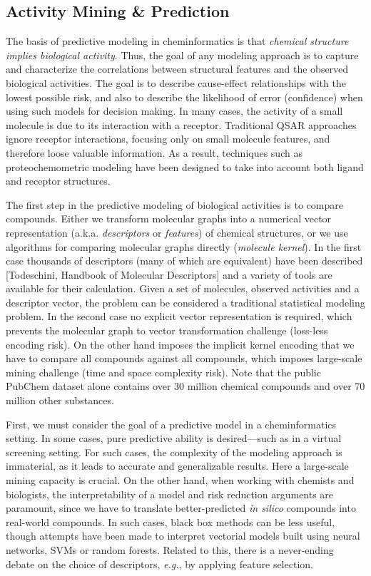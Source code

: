 \documentclass{sig-alternate}
\begin{document}
\subsection{Activity Mining \& Prediction}
\label{sec:activity-mining-}


The basis of predictive modeling in cheminformatics is that \emph{chemical structure
implies biological activity}. Thus, the goal of any modeling approach is to
capture and characterize the correlations between structural features and the
observed biological activities. The goal is to describe cause-effect
relationships with the lowest possible risk, and also to describe the
likelihood of error (confidence) when using such models for decision making. In
many cases, the activity of a small molecule is due to its interaction with a
receptor. Traditional QSAR approaches ignore receptor interactions, focusing
only on small molecule features, and therefore loose valuable information. As a
result, techniques such as proteochemometric modeling have been designed
to take into account both ligand and receptor structures.

The first step in the predictive modeling of biological activities is
to compare compounds. Either we transform molecular graphs into a
numerical vector representation (a.k.a. \emph{descriptors} or
\emph{features}) of chemical structures, or we use algorithms for
comparing molecular graphs directly (\emph{molecule kernel}). In the
first case thousands of descriptors (many of which are equivalent)
have been described [Todeschini, Handbook of Molecular Descriptors]
and a variety of tools are available for their calculation. Given a
set of molecules, observed activities and a descriptor vector, the
problem can be considered a traditional statistical modeling
problem. In the second case no explicit vector representation is
required, which prevents the molecular graph to vector transformation
challenge (loss-less encoding risk). On the other hand imposes the
implicit kernel encoding that we have to compare all compounds against
all compounds, which imposes large-scale mining challenge (time and
space complexity risk). Note that the public PubChem dataset alone
contains over 30 million chemical compounds and over 70 million other
substances.

First, we must consider the goal of a predictive model in a
cheminformatics setting. In some cases, pure predictive ability is
desired---such as in a virtual screening setting. For such cases, the
complexity of the modeling approach is immaterial, as it leads to
accurate and generalizable results. Here a large-scale mining capacity
is crucial. On the other hand, when working with chemists and
biologists, the interpretability of a model and risk reduction
arguments are paramount, since we have to translate better-predicted
\emph{in silico} compounds into real-world compounds. In such cases,
black box methods can be less useful, though attempts have been made
to interpret vectorial models built using neural networks, SVMs or
random forests. Related to this, there is a never-ending debate on the
choice of descriptors, \emph{e.g.}, by applying feature selection.
\end{document}
